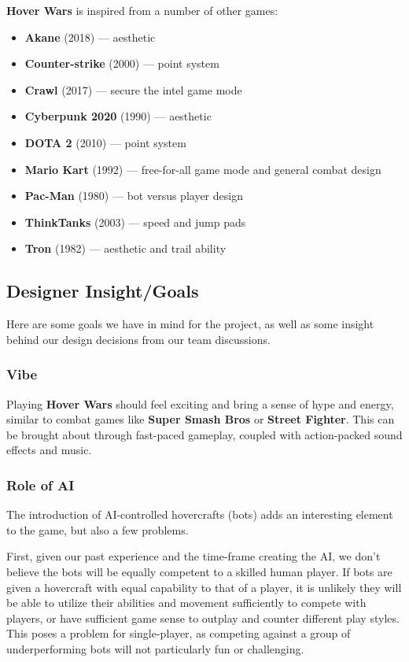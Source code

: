 \documentclass{article}
\newcommand{\namenobold}{Hover Wars}
\newcommand{\name}{\textbf{\namenobold}}
\theoremstyle{definition}
\begin{document}
\name{} is inspired from a number of other games:
\begin{itemize}
  \item \textbf{Akane} (2018) --- aesthetic
  \item \textbf{Counter-strike} (2000) --- point system
  \item \textbf{Crawl} (2017) --- secure the intel game mode
  \item \textbf{Cyberpunk 2020} (1990) --- aesthetic
  \item \textbf{DOTA 2} (2010) --- point system
  \item \textbf{Mario Kart} (1992) --- free-for-all game mode and general combat design
  \item \textbf{Pac-Man} (1980) --- bot versus player design
  \item \textbf{ThinkTanks} (2003) --- speed and jump pads
  \item \textbf{Tron} (1982) --- aesthetic and trail ability
\end{itemize}

\subsection{Designer Insight/Goals}

Here are some goals we have in mind for the project, as well as some insight
behind our design decisions from our team discussions.

\subsubsection{Vibe}

Playing \name{} should feel exciting and bring a sense of hype and energy,
similar to combat games like \textbf{Super Smash Bros} or \textbf{Street
Fighter}. This can be brought about through fast-paced gameplay, coupled with
action-packed sound effects and music.

\subsubsection{Role of AI}

The introduction of AI-controlled hovercrafts (bots) adds an interesting
element to the game, but also a few problems.

First, given our past experience and the time-frame creating the AI, we don't
believe the bots will be equally competent to a skilled human player. If bots
are given a hovercraft with equal capability to that of a player, it is
unlikely they will be able to utilize their abilities and movement sufficiently
to compete with players, or have sufficient game sense to outplay and counter
different play styles. This poses a problem for single-player, as competing
against a group of underperforming bots will not particularly fun or
challenging.
\end{document}
